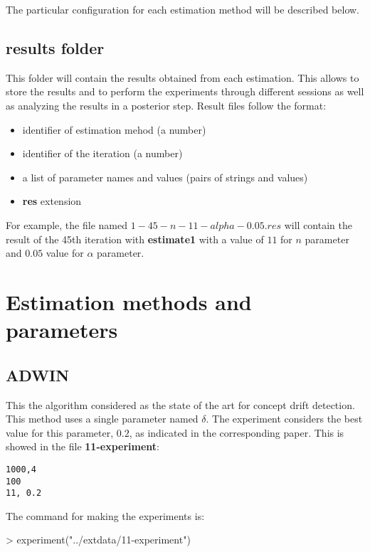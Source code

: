 \documentclass{article}
\begin{document}
The particular configuration for each estimation method will be described below.

\subsection{results folder}

This folder will contain the results obtained from each estimation. This allows
to store the results and to perform the experiments through different sessions
as well as analyzing the results in a posterior step. Result files follow the
format:

\begin{itemize}
\item identifier of estimation mehod (a number)
\item identifier of the iteration (a number)
\item a list of parameter names and values (pairs of strings and values)
\item \textbf{res} extension
\end{itemize}

For example, the file named $1-45-n-11-alpha-0.05.res$ will contain the result
of the 45th iteration with \textbf{estimate1} with a value of $11$ for $n$
parameter and $0.05$ value for $\alpha$ parameter.

\section{Estimation methods and parameters}

\subsection{ADWIN}

This the algorithm considered as the state of the art for concept drift detection. This
method uses a single parameter named $\delta$. The experiment considers the best value
for this parameter, $0.2$, as indicated in the corresponding paper. This is showed in
the file \textbf{11-experiment}:

\begin{verbatim}
1000,4
100
11, 0.2
\end{verbatim}

The command for making the experiments is:

\begin{Schunk}
\begin{Sinput}
> experiment("../extdata/11-experiment")
\end{Sinput}
\end{Schunk}
\end{document}
